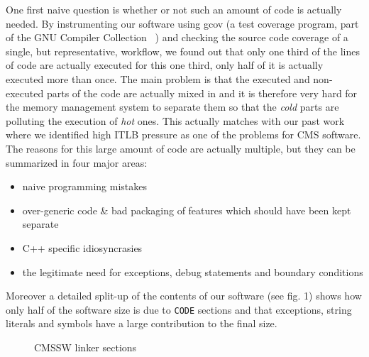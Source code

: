 \documentclass[a4paper]{jpconf}
\begin{document}
One first naive question is whether or not such an amount of code is actually needed. By instrumenting our software using gcov (a test coverage program, part of the GNU Compiler Collection ~\cite{GCov}) and checking the source code coverage of a single, but representative, workflow, we found out that only one third of the lines of code are actually executed for this one third, only half of it is actually executed more than once. The main problem is that the executed and non-executed parts of the code are actually mixed in and it is therefore very hard for the memory management system to separate them so that the {\itshape cold} parts are polluting the execution of {\itshape hot} ones.
This actually matches with our past work ~\cite{Tuura:2008p00019} where we identified high ITLB pressure as one of the problems for CMS software.
The reasons for this large amount of code are actually multiple, but they can be summarized in four major areas:


\begin{itemize}


\item naive programming mistakes

\item over-generic code \& bad packaging of features which should have been kept separate

\item C++ specific idiosyncrasies

\item the legitimate need for exceptions, debug statements and boundary conditions
\end{itemize}

Moreover a detailed split-up of the contents of our software (see fig. 1) shows how only half of the software size is due to \texttt{CODE} sections and that exceptions, string literals and symbols have a large contribution to the final size.


\begin{figure}
\caption{CMSSW linker sections}
\label{}
\begin{center}
\end{center}
\end{figure}
\end{document}
